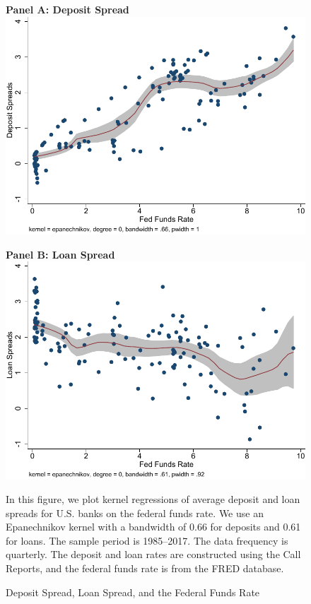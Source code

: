 \documentclass[12pt]{article}
\begin{document}
	

\clearpage
\newpage
\begin{figure}[h]
	\begin{centering}
		
		
		\textbf{Panel A: Deposit Spread} \\
		\includegraphics[scale=.8]{../output/Figures/lpoly_deposit_spread}
		
		\textbf{Panel B: Loan Spread} \\
		\includegraphics[scale=.8]{../output/Figures/lpoly_loan_spread}
		
		\par
		\caption{Deposit Spread, Loan Spread, and the Federal Funds Rate\label{fig:lpoly_deposit_spread}}
	\end{centering}
	{\footnotesize{In this figure, we plot kernel regressions of average deposit and loan spreads for U.S. banks on the federal funds rate.  We use an Epanechnikov kernel with a bandwidth of 0.66 for deposits and 0.61 for loans. The sample period is 1985--2017. The data frequency is quarterly.  The deposit and loan rates are constructed using the Call Reports, and the federal funds rate is  from the FRED database.}}
\end{figure}
\end{document}
